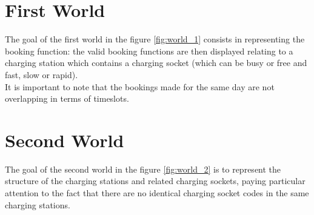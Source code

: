 \section{First World}
The goal of the first world in the figure \ref{fig:world_1} consists in representing the booking function: the valid booking functions are then displayed relating to a charging station which contains a charging socket (which can be busy or free and fast, slow or rapid).\\
It is important to note that the bookings made for the same day are not overlapping in terms of timeslots.
\section{Second World}
The goal of the second world in the figure \ref{fig:world_2} is to represent the structure of the charging stations and related charging sockets, paying particular attention to the fact that there are no identical charging socket codes in the same charging stations.